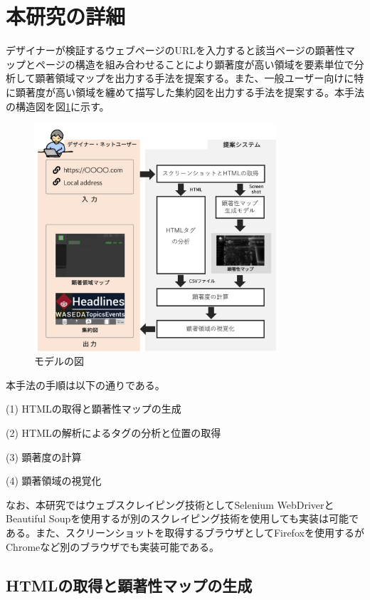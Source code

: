 \newpage
\renewcommand{\baselinestretch}{1.5}
\section{本研究の詳細}
\renewcommand{\baselinestretch}{1}

\par デザイナーが検証するウェブページのURLを入力すると該当ページの顕著性マップとページの構造を組み合わせることにより顕著度が高い領域を要素単位で分析して顕著領域マップを出力する手法を提案する。また、一般ユーザー向けに特に顕著度が高い領域を纏めて描写した集約図を出力する手法を提案する。本手法の構造図を図\ref{fig_ourmodel}に示す。

\begin{figure}[H]
    \centering
    \includegraphics[width=9cm]{figures/model.png}
    \caption{モデルの図}
    \label{fig_ourmodel}
\end{figure}

\par 本手法の手順は以下の通りである。
\par(1) HTMLの取得と顕著性マップの生成
\par(2) HTMLの解析によるタグの分析と位置の取得
\par(3) 顕著度の計算
\par(4) 顕著領域の視覚化\\

\par なお、本研究ではウェブスクレイピング技術としてSelenium WebDriverとBeautiful Soupを使用するが別のスクレイピング技術を使用しても実装は可能である。また、スクリーンショットを取得するブラウザとしてFirefoxを使用するがChromeなど別のブラウザでも実装可能である。

\subsection{HTMLの取得と顕著性マップの生成}\label{subsec:system01}

